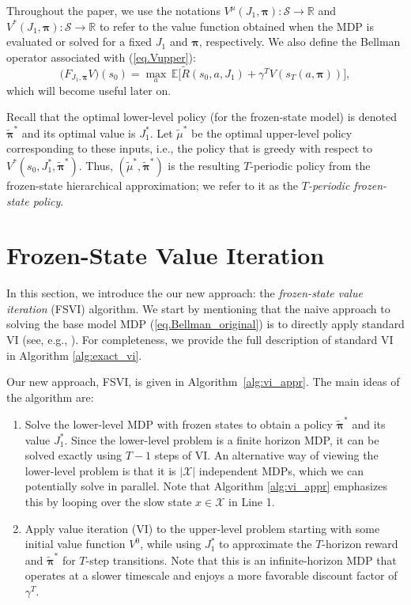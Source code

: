 \documentclass[11pt, notitlepage]{article}
\newcommand{\E}{\mathbb{E}}
\newcommand{\1}{\mathbbm{1}}
\begin{document}
Throughout the paper, we use the notations $V^\mu(J_1, \boldsymbol{\pi}) : \mathcal S \rightarrow \mathbb R$ and $V^*(J_1, \boldsymbol{\pi}):\mathcal S \rightarrow \mathbb R$ to refer to the value function obtained when the MDP is evaluated or solved for a fixed $J_1$ and $\boldsymbol{\pi}$, respectively. We also define the Bellman operator associated with (\ref{eq.Vupper}):
\begin{equation} \label{eq.Vupper_operator}
    \bigl(F_{J_1, \boldsymbol{\pi}} V\bigr)(s_0)
    = \max_{a} \, \E\bigl[\tilde{R}(s_0, a, J_1) + \gamma^T V(s_T(a, \boldsymbol{\pi}))\bigr],
\end{equation}
which will become useful later on. 

 Recall that the optimal lower-level policy (for the frozen-state model) is denoted $\tilde{\boldsymbol{\pi}}^*$ and its optimal value is $J_1^*$. Let $\tilde{\mu}^*$ be the optimal upper-level policy corresponding to these inputs, i.e., the policy that is greedy with respect to $V^*(s_0,J_1^*,\tilde{\boldsymbol{\pi}}^*)$. Thus, $(\tilde{\mu}^*, \tilde{\boldsymbol{\pi}}^*)$ is the resulting $T$-periodic policy from the frozen-state hierarchical approximation; we refer to it as the \emph{$T$-periodic frozen-state policy}.




\section{Frozen-State Value Iteration} \label{sec:frozen_state_error}
In this section, we introduce the our new approach: the \emph{frozen-state value iteration} (FSVI) algorithm. We start by mentioning that the naive approach to solving the base model MDP (\ref{eq.Bellman_original}) is to directly apply standard VI (see, e.g., \cite{bertsekas1996neuro}). For completeness, we provide the full description of standard VI in Algorithm \ref{alg:exact_vi}. 

Our new approach, FSVI, is given in Algorithm~\ref{alg:vi_appr}. The main ideas of the algorithm are:
\begin{enumerate}
\item Solve the lower-level MDP with frozen states to obtain a policy $\tilde{\boldsymbol{\pi}}^*$ and its value $J_1^*$. Since the lower-level problem is a finite horizon MDP, it can be solved exactly using $T-1$ steps of VI. An alternative way of viewing the lower-level problem is that it is $|\mathcal X|$ independent MDPs, which we can potentially solve in parallel. Note that Algorithm \ref{alg:vi_appr} emphasizes this by looping over the slow state $x \in \mathcal X$ in Line 1.
\item Apply value iteration (VI) to the upper-level problem starting with some initial value function $V^0$, while using $J_1^*$ to approximate the $T$-horizon reward and $\tilde{\boldsymbol{\pi}}^*$ for $T$-step transitions. Note that this is an infinite-horizon MDP that operates at a slower timescale and enjoys a more favorable discount factor of $\gamma^T$.
\end{enumerate}
\end{document}
